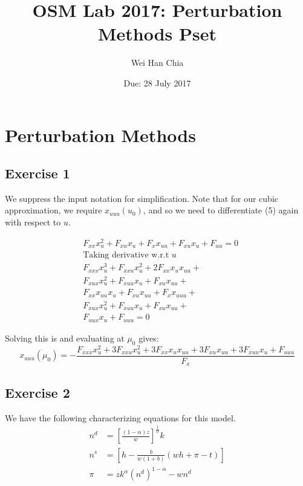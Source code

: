 \documentclass{article}
\begin{document}
	\title{OSM Lab 2017: Perturbation Methods Pset }
	\author{Wei Han Chia}
	\date{Due: 28 July 2017}
	\maketitle
	
	\section*{Perturbation Methods}
	
	\subsection*{Exercise 1}
	We suppress the input notation for simplification. Note that for our cubic approximation, we require $x_{uuu}(u_{0})$, and so we need to differentiate (5) again with respect to $u$.
	
	\begin{align*}
	&F_{xx} x_u^2 + F_{xu} x_u + F_{x} x_{uu} + F_{xu} x_u + F_{uu} = 0 \\
	&\text{Taking derivative w.r.t $u$} \\
	&F_{xxx} x_u^3 + F_{xxu}x_u^2 + 2 F_{xx} x_u x_{uu} +  \\
	&F_{xux} x_u^2 + F_{xuu} x_u + F_{xu} x_{uu} + \\
	&F_{xx} x_{uu} x_{u} + F_{xu} x_{uu} + F_{x} x_{uuu} + \\
	&F_{xux} x_{u}^2 + F_{xuu} x_u + F_{xu} x_{uu} + \\
	&F_{uux} x_{u} + F_{uuu} = 0
	\end{align*}
	
	Solving this is and evaluating at $\mu_0$ gives:
	\[ x_{uuu}(\mu_0) = - \frac{F_{xxx} x_{u}^2 + 3 F_{xxu} x_u^2 + 3 F_{xx} x_u x_{uu}  + 3 F_{xu} x_{uu} +  3 F_{xuu} x_{u} + F_{uuu}}{F_{x}} \]
	
	\newpage
	\subsection*{Exercise 2}
	We have the following characterizing equations for this model. 
	\begin{align*}
	n^d &= \left[ \frac{(1-\alpha) z}{w} \right]^{\frac{1}{\alpha}} k \\
	n^s &= \left[ h - \frac{b}{w(1+b)} (wh + \pi - t) \right] \\
	\pi &= z k^{\alpha} (n^d)^{1-\alpha} - wn^d 
	\end{align*}
	
\end{document}
